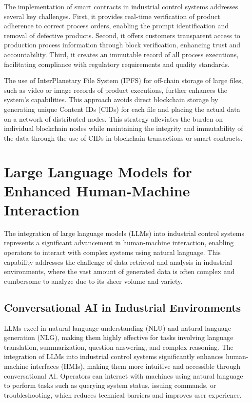 The implementation of smart contracts in industrial control systems addresses several key challenges. First, it provides real-time verification of product adherence to correct process orders, enabling the prompt identification and removal of defective products. Second, it offers customers transparent access to production process information through block verification, enhancing trust and accountability. Third, it creates an immutable record of all process executions, facilitating compliance with regulatory requirements and quality standards.

The use of InterPlanetary File System (IPFS) for off-chain storage of large files, such as video or image records of product executions, further enhances the system's capabilities. This approach avoids direct blockchain storage by generating unique Content IDs (CIDs) for each file and placing the actual data on a network of distributed nodes. This strategy alleviates the burden on individual blockchain nodes while maintaining the integrity and immutability of the data through the use of CIDs in blockchain transactions or smart contracts.

\section{Large Language Models for Enhanced Human-Machine Interaction}

The integration of large language models (LLMs) into industrial control systems represents a significant advancement in human-machine interaction, enabling operators to interact with complex systems using natural language. This capability addresses the challenge of data retrieval and analysis in industrial environments, where the vast amount of generated data is often complex and cumbersome to analyze due to its sheer volume and variety.

\subsection{Conversational AI in Industrial Environments}

LLMs excel in natural language understanding (NLU) and natural language generation (NLG), making them highly effective for tasks involving language translation, summarization, question answering, and complex reasoning. The integration of LLMs into industrial control systems significantly enhances human-machine interfaces (HMIs), making them more intuitive and accessible through conversational AI. Operators can interact with machines using natural language to perform tasks such as querying system status, issuing commands, or troubleshooting, which reduces technical barriers and improves user experience.


